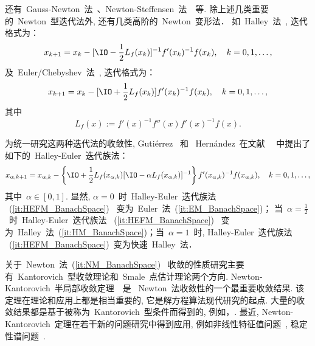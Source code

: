 还有~Gauss-Newton~法~\cite{Ortega1970}、Newton-Steffensen~法~\cite{LingXu2013}~等.
除上述几类重要的~Newton~型迭代法外, 还有几类高阶的~Newton~变形法．
如~Halley~法~\cite{Candela1990a}, 迭代格式为：
\begin{equation}
\label{it:HM_BanachSpace} x_{k+1} = x_k - [\IO -
\frac{1}{2}L_f(x_k)]^{-1}f'(x_k)^{-1}f(x_k), \quad k=0,1,\ldots,
\end{equation}
及~Euler/Chebyshev~法~\cite{Candela1990b}, 迭代格式为：
\begin{equation}
\label{it:EM_BanachSpace} x_{k+1} = x_k - [\IO +
\frac{1}{2}L_f(x_k)]f'(x_k)^{-1}f(x_k), \quad k=0,1,\ldots,
\end{equation}
其中
$$L_f(x) := f'(x)^{-1}f''(x)f'(x)^{-1}f(x).
$$



为统一研究这两种迭代法的收敛性, Guti\'{e}rrez~ 和
~Hern\'{a}ndez~在文献
~\cite{Gutierrez1997a}~中提出了如下的~Halley-Euler~迭代族法：
\begin{equation}
\label{it:HEFM_BanachSpace} x_{\alpha,k+1} = x_{\alpha,k} -
\left\{\IO + \frac{1}{2}L_f(x_{\alpha,k})[\IO - \alpha
L_f(x_{\alpha,k})]^{-1}\right\}f'(x_{\alpha,k})^{-1}f(x_{\alpha,k}),
\quad k=0,1,\ldots,
\end{equation}
其中~$\alpha \in [0,1]$. 显然, $\alpha = 0$~时~Halley-Euler~迭代族法
~(\ref{it:HEFM_BanachSpace})~
变为~Euler~法~(\ref{it:EM_BanachSpace})； 当~$\alpha =
\frac{1}{2}$~时~Halley-Euler~迭代族法 ~(\ref{it:HEFM_BanachSpace})~
变为~Halley~法~(\ref{it:HM_BanachSpace})；当~$\alpha = 1$~时,
Halley-Euler~迭代族法
~(\ref{it:HEFM_BanachSpace})~变为快速~Halley~法．


关于~Newton~法~(\ref{it:NM_BanachSpace})~
收敛的性质研究主要有~Kantorovich~型收敛理论和~Smale~点估计理论两个方向.
Newton-Kantorovich~半局部收敛定理~\cite{Kantorvich1982}~是
~Newton~法收敛性的一个最重要收敛结果.
该定理在理论和应用上都是相当重要的, 它是解方程算法现代研究的起点.
大量的收敛结果都是基于被称为~Kantorovich~型条件而得到的,
例如，\cite{Ortega1970,Rokne1972,Rall1974,GraggTapia1974,Deuflhard1979,
Huang1993,Gutierrez1997a,Wang1999,Gutierrez2000,Ezquerro2002}. 最近,
Newton-Kantorovich~定理在若干新的问题研究中得到应用,
例如非线性特征值问题~\cite{SzyldXue2013,SzyldXue2014},
稳定性谱问题~\cite{Vleck2010,BadawyVleck2012,BredaVleck2014}.

